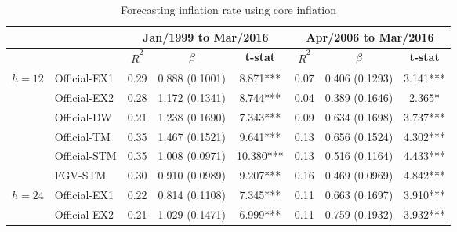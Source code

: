 \documentclass[10pt]{article}
\begin{document}
\begin{table}[h]
\centering
\caption{Forecasting inflation rate using core inflation}\label{infla_prev}
\begin{threeparttable}
\begin{tabular}{@{}cl|ccc|ccc@{}}
\toprule
\multicolumn{1}{l}{}               &  & \multicolumn{3}{c|}{Jan/1999 to Mar/2016} & \multicolumn{3}{c}{Apr/2006 to Mar/2016} \\ \midrule
                                   & \textbf{}                         & \textbf{$\bar{R}^2$} & \textbf{$\beta$} & \textbf{t-stat}   & \textbf{$\bar{R}^2$} & \textbf{$\beta$} & \textbf{t-stat} \\ \midrule

\multirow{6}{*}{\textbf{$h = 12$}} & \multicolumn{1}{l|}{Official-EX1} & 0.29                 & 0.888 (0.1001)   & 8.871***          & 0.07                 & 0.406 (0.1293)   & 3.141***        \\
                                   & \multicolumn{1}{l|}{Official-EX2} & 0.28                 & 1.172 (0.1341)   & 8.744***          & 0.04                 & 0.389 (0.1646)   & 2.365*        \\
                                   & \multicolumn{1}{l|}{Official-DW}  & 0.21                 & 1.238 (0.1690)   & 7.343***          & 0.09                 & 0.634 (0.1698)   & 3.737***        \\
                                   & \multicolumn{1}{l|}{Official-TM}  & 0.35                 & 1.467 (0.1521)   & 9.641***          & 0.13                 & 0.656 (0.1524)   & 4.302***        \\
                                   & \multicolumn{1}{l|}{Official-STM} & 0.35                 & 1.008 (0.0971)   & 10.380***         & 0.13                 & 0.516 (0.1164)   & 4.433***       \\
                                   & \multicolumn{1}{l|}{FGV-STM}      & 0.30                 & 0.910 (0.0989)   & 9.207***          & 0.16                 & 0.469 (0.0969)   & 4.842***        \\ \midrule
\multirow{6}{*}{\textbf{$h = 24$}} & \multicolumn{1}{l|}{Official-EX1} & 0.22                 & 0.814 (0.1108)   & 7.345***          & 0.11                 & 0.663 (0.1697)   & 3.910***        \\
                                   & \multicolumn{1}{l|}{Official-EX2} & 0.21                 & 1.029 (0.1471)   & 6.999***          & 0.11                 & 0.759 (0.1932)   & 3.932***        \\

\end{tabular}
\end{threeparttable}
\end{table}
\end{document}

